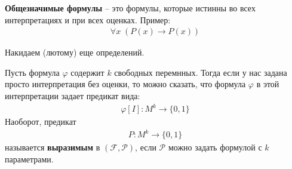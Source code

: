 \vspace{3mm}

\begin{conj}
    \textbf{Общезначимые формулы} -- это формулы, которые истинны во всех интерпретациях и при всех оценках. 
    Пример:
    \begin{gather*}
        \forall x \; (P(x) \longrightarrow P(x))
    \end{gather*}
\end{conj}

Накидаем (лютому) еще определений. 
\begin{conj}
    Пусть формула $\varphi$ содержит $k$ свободных перемнных. Тогда если у нас задана просто интерпретация без оценки, то можно сказать, что формула $\varphi$ в этой интерпретации задает предикат вида:
    \begin{gather*}
        \varphi[I] : M^k \longrightarrow \{0, 1\}
    \end{gather*}
    Наоборот, предикат
    \begin{gather*}
        P : M^k \longrightarrow \{0, 1\} 
    \end{gather*}
    называется \textbf{выразимым} в $(\mathcal{F}, \mathcal{P})$, если $\mathcal{P}$ можно задать формулой с $k$ параметрами. 
\end{conj}

\vspace{3mm}

